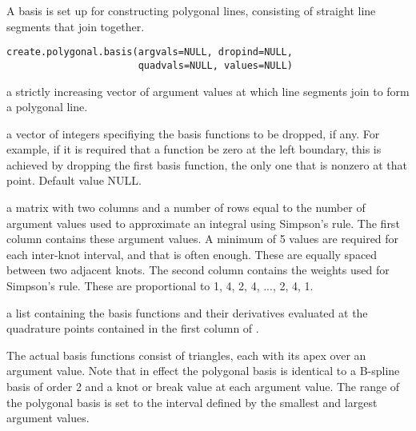 \documentclass{article}
\begin{document}
\begin{Description}\relax
A basis is set up for constructing polygonal lines, consisting of 
straight line segments that join together.
\end{Description}
\begin{Usage}
\begin{verbatim}
create.polygonal.basis(argvals=NULL, dropind=NULL,
                       quadvals=NULL, values=NULL)
\end{verbatim}
\end{Usage}
\begin{Arguments}
\begin{ldescription}
\item[\code{argvals}] a strictly increasing vector of argument values at which line
segments join to form a polygonal line.

\item[\code{dropind}] a vector of integers specifiying the basis functions to
be dropped, if any.  For example, if it is required that
a function be zero at the left boundary, this is achieved
by dropping the first basis function, the only one that
is nonzero at that point. Default value NULL.

\item[\code{quadvals}] a matrix with two columns and a number of rows equal to the number
of argument values used to approximate an integral using Simpson's
rule.  The first column contains these argument values.  
A minimum of 5 values are required for
each inter-knot interval, and that is often enough. These
are equally spaced between two adjacent knots.
The second column contains the weights used for Simpson's
rule.  These are proportional to 1, 4, 2, 4, ..., 2, 4, 1.

\item[\code{values}] a list containing the basis functions and their derivatives
evaluated at the quadrature points contained in the first
column of .

\end{ldescription}
\end{Arguments}
\begin{Details}\relax
The actual basis functions consist of triangles, each with its apex
over an argument value. Note that in effect the polygonal basis is
identical to a B-spline basis of order 2 and a knot or break value at
each argument value.  The range of the polygonal basis is set to the
interval defined by the smallest and largest argument values.
\end{Details}
\end{document}
